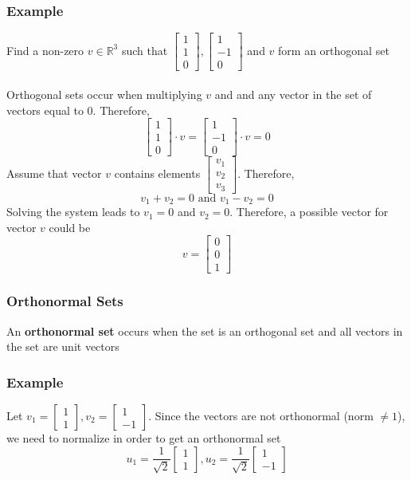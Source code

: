 \subsubsection{Example}
Find a non-zero $v \in \mathbb{R}^3$ such that $\begin{bmatrix} 1 \\ 1 \\ 0 \end{bmatrix}, \begin{bmatrix}
1 \\ -1 \\ 0 \end{bmatrix}$ and $v$ form an orthogonal set \\\\
Orthogonal sets occur when multiplying $v$ and and any vector in the set of vectors equal to $0$. Therefore,
\[
  \begin{bmatrix} 1 \\ 1 \\ 0 \end{bmatrix} \cdot v = \begin{bmatrix} 1 \\ -1 \\ 0 \end{bmatrix} \cdot v = 0
\]
Assume that vector $v$ contains elements $\begin{bmatrix} v_1 \\ v_2 \\ v_3 \end{bmatrix}$. Therefore,
\[
  v_1 + v_2 = 0 \text{  and  } v_1 - v_2 = 0
\]
Solving the system leads to $v_1 = 0$ and $v_2 = 0$. Therefore, a possible vector for vector $v$ could be 
\[
  v = \begin{bmatrix} 0 \\ 0 \\ 1 \end{bmatrix}
\]
\subsubsection{Orthonormal Sets}
An \textbf{orthonormal set} occurs when the set is an orthogonal set and all vectors in the set are unit vectors
\subsubsection{Example}
Let $v_1 = \begin{bmatrix} 1 \\ 1 \end{bmatrix}, v_2 = \begin{bmatrix} 1 \\ -1 \end{bmatrix}$. Since the 
vectors are not orthonormal (norm $\neq 1$), we need to normalize in order to get an orthonormal set 
\[
  u_1 = \frac{1}{\sqrt{2}}\begin{bmatrix} 1 \\ 1 \end{bmatrix}, 
  u_2 = \frac{1}{\sqrt{2}}\begin{bmatrix} 1 \\ -1 \end{bmatrix}
\]
